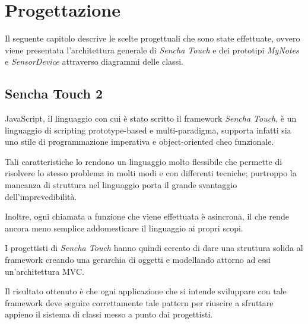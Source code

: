 \chapter{Progettazione}\label{ch:progettazione}
Il seguente capitolo descrive le scelte progettuali che sono state effettuate, ovvero viene presentata l'architettura generale di \emph{Sencha Touch} e dei prototipi \emph{MyNotes} e \emph{SensorDevice} attraverso diagrammi delle classi.

\section{Sencha Touch 2}
JavaScript, il linguaggio con cui è stato scritto il framework \emph{Sencha Touch}, è un linguaggio di scripting prototype-based e multi-paradigma, supporta infatti sia uno stile di programmazione imperativa e object-oriented cheo funzionale.

Tali caratteristiche lo rendono un linguaggio molto flessibile che permette di risolvere lo stesso problema in molti modi e con differenti tecniche; purtroppo la mancanza di struttura nel linguaggio porta il grande svantaggio dell'imprevedibilità.

Inoltre, ogni chiamata a funzione che viene effettuata è asincrona, il che rende ancora meno semplice addomesticare il linguaggio ai propri scopi.

I progettisti di \emph{Sencha Touch} hanno quindi cercato di dare una struttura solida al framework creando una gerarchia di oggetti e modellando attorno ad essi un'architettura \ac{MVC}.

Il risultato ottenuto è che ogni applicazione che si intende sviluppare con tale framework deve seguire correttamente tale pattern per riuscire a sfruttare appieno il sistema di classi messo a punto dai progettisti.


